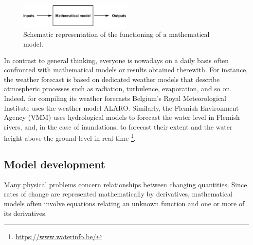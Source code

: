 \begin{figure}[h]
	\begin{center}
			\includegraphics[width=0.5\textwidth]{Intro_1.pdf}
	\caption{Schematic representation of the functioning of a mathematical model. }
	\label{Intro_1}
	\end{center}
\end{figure}

In contrast to general thinking, everyone is nowadays on a daily basis often confronted with mathematical models or results obtained therewith. For instance, the weather forecast is based on dedicated weather models that describe atmospheric processes such as radiation, turbulence, evaporation, and so on. Indeed, for compiling its weather forecasts Belgium's Royal Meteorological Institute uses the weather model ALARO. Similarly, the Flemish Environment Agency (VMM) uses hydrological models to  forecast the water level in Flemish rivers, and, in the case of inundations, to forecast their extent and the water height above the ground level in real time \footnote{\url{https://www.waterinfo.be/}}.

\subsection{Model development}
Many physical problems concern relationships between changing quantities. Since rates of change are represented mathematically by
derivatives, mathematical models often involve equations relating an unknown function and one or more of its derivatives.

